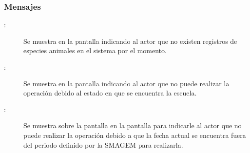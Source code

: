 \subsubsection{Mensajes}

    \begin{description}
	\item [:] Se muestra en la pantalla  indicando al actor que no existen registros de especies animales en el sistema por el momento.
	
	\item[:] Se muestra en la pantalla  indicando al actor que no puede realizar la operación debido al estado en que se encuentra la escuela.
	
	\item [:] Se muestra sobre la pantalla en la pantalla  para indicarle al actor que no puede realizar la operación debido a que la fecha actual se encuentra fuera del periodo definido por la SMAGEM para realizarla.
    \end{description}